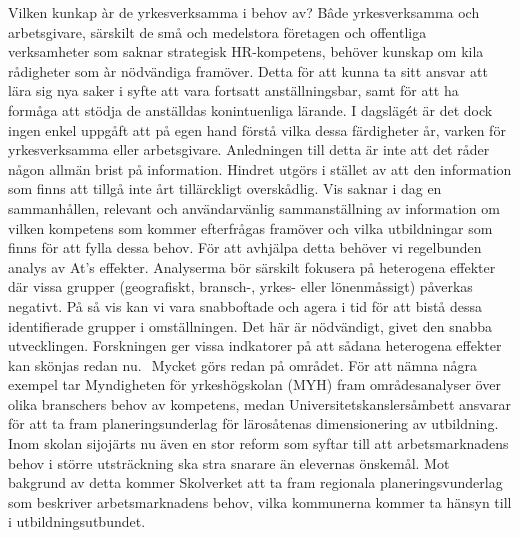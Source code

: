 {{{{{{{{{{{{Vilken kunkap àr de yrkesverksamma i behov av?
Bâde yrkesverksamma och arbetsgivare, särskilt de små och medelstora företagen och offentliga verksamheter som saknar strategisk HR-kompetens, behöver kunskap om kila rådigheter som àr nödvändiga framöver. Detta för att kunna ta sitt ansvar att lära sig nya saker i syfte att vara fortsatt anställningsbar, samt för att ha formåga att stödja de anställdas konintuenliga lärande. I dagslägét är det dock ingen enkel uppgåft att på egen hand förstå vilka dessa färdigheter år, varken för yrkesverksamma eller arbetsgivare.
Anledningen till detta är inte att det råder någon allmän brist på information. Hindret utgörs i stället av att den information som finns att tillgå inte årt tillärckligt overskådlig. Vis saknar i dag en sammanhållen, relevant och användarvänlig sammanställning av information om vilken kompetens som kommer efterfrågas framöver och vilka utbildningar som finns för att fylla dessa behov. För att avhjälpa detta behöver vi regelbunden analys av At's effekter. Analyserma bör särskilt fokusera på heterogena effekter där vissa grupper (geografiskt, bransch-, yrkes- eller lönenmåssigt) påverkas negativt. På så vis kan vi vara snabboftade och agera i tid för att bistå dessa identifierade grupper i omställningen. Det här är nödvändigt, givet den snabba utvecklingen. Forskningen ger vissa indkatorer på att sådana heterogena effekter kan skönjas redan nu. \({ }^{}\)
Mycket görs redan på området. För att nämna några exempel tar Myndigheten för yrkeshögskolan (MYH) fram områdesanalyser över olika branschers behov av kompetens, medan Universitetskanslersåmbett ansvarar för att ta fram planeringsunderlag för lärosåtenas dimensionering av utbildning. Inom skolan sijojärts nu även en stor reform som syftar till att arbetsmarknadens behov i större utsträckning ska stra snarare än elevernas önskemål. Mot bakgrund av detta kommer Skolverket att ta fram regionala planeringsvunderlag som beskriver arbetsmarknadens behov, vilka kommunerna kommer ta hänsyn till i utbildningsutbundet.

}}}}}}}}}}}}
